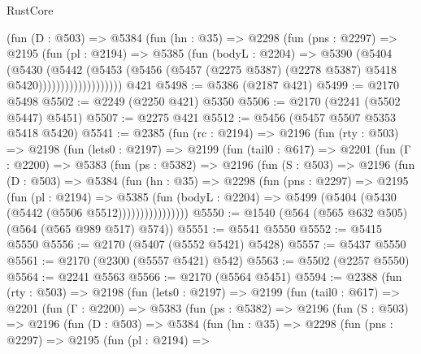 \begin{lexlean}{RustCore}
\begin{coremodule}
                    (fun (D : @503) =>
                    @5384
                      (fun (hn : @35) =>
                      @2298
                        (fun (pns : @2297) =>
                        @2195
                          (fun (pl : @2194) =>
                          @5385
                            (fun (bodyL : @2204) =>
                            @5390
                              (@5404
                                (@5430
                                  (@5442
                                    (@5453
                                      (@5456
                                        (@5457
                                          (@2275 @5387)
                                          (@2278 @5387)
                                          @5418
                                          @5420)))))))))))))))))))
    @421
@5498 := @5386 (@2187 @421)
@5499 := @2170 @5498
@5502 := @2249 (@2250 @421) @5350
@5506 := @2170 (@2241 (@5502 @5447) @5451)
@5507 := @2275 @421
@5512 := @5456 (@5457 @5507 @5353 @5418 @5420)
@5541 := @2385
    (fun (rc : @2194) =>
    @2196
      (fun (rty : @503) =>
      @2198
        (fun (lets0 : @2197) =>
        @2199
          (fun (tail0 : @617) =>
          @2201
            (fun (Γ : @2200) =>
            @5383
              (fun (ps : @5382) =>
              @2196
                (fun (S : @503) =>
                @2196
                  (fun (D : @503) =>
                  @5384
                    (fun (hn : @35) =>
                    @2298
                      (fun (pns : @2297) =>
                      @2195
                        (fun (pl : @2194) =>
                        @5385
                          (fun (bodyL : @2204) =>
                          @5499 (@5404 (@5430 (@5442 (@5506 @5512))))))))))))))))
@5550 := @1540 (@564 (@565 @632 @505) (@564 (@565 @989 @517) @574))
@5551 := @5541 @5550
@5552 := @5415 @5550
@5556 := @2170 (@5407 (@5552 @5421) @5428)
@5557 := @5437 @5550
@5561 := @2170 (@2300 (@5557 @5421) @542)
@5563 := @5502 (@2257 @5550)
@5564 := @2241 @5563
@5566 := @2170 (@5564 @5451)
@5594 := @2388
    (fun (rty : @503) =>
    @2198
      (fun (lets0 : @2197) =>
      @2199
        (fun (tail0 : @617) =>
        @2201
          (fun (Γ : @2200) =>
          @5383
            (fun (ps : @5382) =>
            @2196
              (fun (S : @503) =>
              @2196
                (fun (D : @503) =>
                @5384
                  (fun (hn : @35) =>
                  @2298
                    (fun (pns : @2297) =>
                    @2195
                      (fun (pl : @2194) =>

\end{coremodule}
\end{lexlean}
